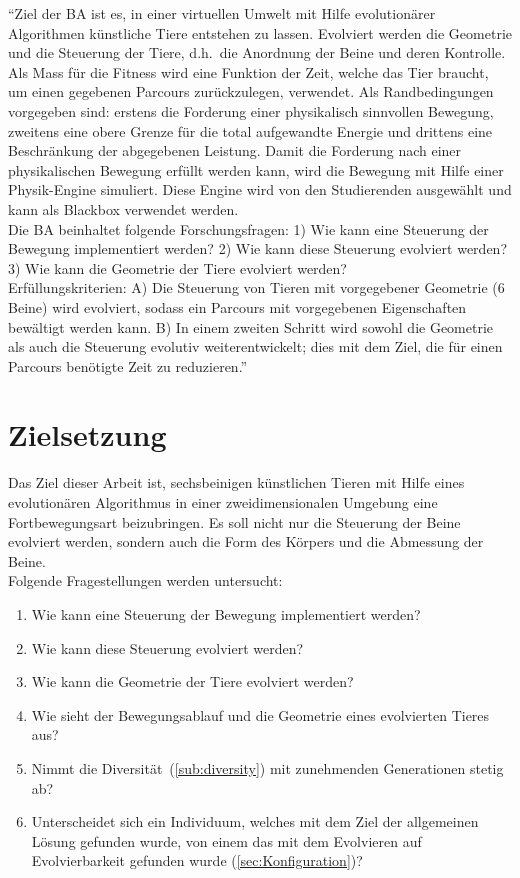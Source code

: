     ``Ziel der BA ist es,
    in einer virtuellen Umwelt mit Hilfe evolutionärer Algorithmen künstliche Tiere entstehen zu lassen.
    Evolviert werden die Geometrie und die Steuerung der Tiere,
    d.h.\ die Anordnung der Beine und deren Kontrolle.
    Als Mass für die Fitness wird eine Funktion der Zeit, welche das Tier braucht,
    um einen gegebenen Parcours zurückzulegen, verwendet.
    Als Randbedingungen vorgegeben sind: erstens die Forderung einer physikalisch sinnvollen Bewegung,
    zweitens eine obere Grenze für die total aufgewandte Energie und drittens eine Beschränkung der abgegebenen Leistung.
    Damit die Forderung nach einer physikalischen Bewegung erfüllt werden kann,
    wird die Bewegung mit Hilfe einer Physik-Engine simuliert.
    Diese Engine wird von den Studierenden ausgewählt und kann als Blackbox verwendet werden.
    \\
    Die BA beinhaltet folgende Forschungsfragen: 1) Wie kann eine Steuerung der Bewegung implementiert werden?
    2) Wie kann diese Steuerung evolviert werden? 3) Wie kann die Geometrie der Tiere evolviert werden?
    \\
    Erfüllungskriterien: A) Die Steuerung von Tieren mit vorgegebener Geometrie (6 Beine) wird evolviert,
    sodass ein Parcours mit vorgegebenen Eigenschaften bewältigt werden kann.
    B) In einem zweiten Schritt wird sowohl die Geometrie als auch die Steuerung evolutiv weiterentwickelt;
    dies mit dem Ziel, die für einen Parcours benötigte Zeit zu reduzieren.''~\cite{Task}

  \section{Zielsetzung}

    Das Ziel dieser Arbeit ist, sechsbeinigen künstlichen Tieren mit Hilfe eines evolutionären Algorithmus
    in einer zweidimensionalen Umgebung eine Fortbewegungsart beizubringen.
    Es soll nicht nur die Steuerung der Beine evolviert werden,
    sondern auch die Form des Körpers und die Abmessung der Beine.
    \\
    Folgende Fragestellungen werden untersucht:

    \begin{enumerate}
      \item Wie kann eine Steuerung der Bewegung implementiert werden?\label{item:frageSteuerungBeine}
      \item Wie kann diese Steuerung evolviert werden?
      \item Wie kann die Geometrie der Tiere evolviert werden?
      \item Wie sieht der Bewegungsablauf und die Geometrie eines evolvierten Tieres aus?
      \item Nimmt die Diversität~(\vref{sub:diversity}) mit zunehmenden Generationen stetig ab?
      \item Unterscheidet sich ein Individuum, welches mit dem Ziel der allgemeinen Lösung gefunden wurde,
            von einem das mit dem Evolvieren auf Evolvierbarkeit gefunden wurde (\vref{sec:Konfiguration})?
    \end{enumerate}

